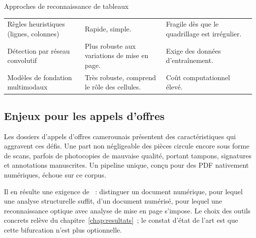 \begin{btptable}{Approches de reconnaissance de tableaux}
\label{tab:tableaux}
\begin{tabularx}{\linewidth}{@{}L{3.4cm} Y Y@{}}
\toprule
{}
 &  &  \\
\midrule
Règles heuristiques (lignes, colonnes) & Rapide, simple. & Fragile dès que le quadrillage est irrégulier. \\
Détection par réseau convolutif & Plus robuste aux variations de mise en page. & Exige des données d'entraînement. \\
Modèles de fondation multimodaux & Très robuste, comprend le rôle des cellules. & Coût computationnel élevé. \\
\bottomrule
\end{tabularx}
\end{btptable}

\subsection{Enjeux pour les appels d'offres}

Les dossiers d'appels d'offres camerounais présentent des caractéristiques
qui aggravent ces défis. Une part non négligeable des pièces circule encore
sous forme de scans, parfois de photocopies de mauvaise qualité, portant
tampons, signatures et annotations manuscrites. Un pipeline unique, conçu
pour des PDF nativement numériques, échoue sur ce corpus.

Il en résulte une exigence de ~: distinguer un
document numérique, pour lequel une analyse structurelle suffit, d'un
document numérisé, pour lequel une reconnaissance optique avec analyse de
mise en page s'impose. Le choix des outils concrets relève du
chapitre~\ref{chap:resultats}~; le constat d'état de l'art est que cette
bifurcation n'est plus optionnelle.
